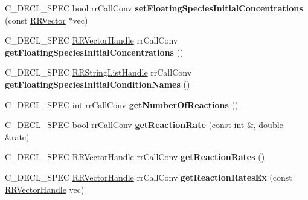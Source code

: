 \begin{DoxyCompactItemize}
\item 
\hypertarget{group__loadsave_ga338d8b7e0648b293a134e69bd7862dc6}{
\-C\-\_\-\-D\-E\-C\-L\-\_\-\-S\-P\-E\-C bool rr\-Call\-Conv {\bfseries set\-Floating\-Species\-Initial\-Concentrations} (const \hyperlink{struct_r_r_vector}{\-R\-R\-Vector} $\ast$vec)}
\label{group__loadsave_ga338d8b7e0648b293a134e69bd7862dc6}

\item 
\hypertarget{group__loadsave_ga6458f13569fc543075b559978f4f83ac}{
\-C\-\_\-\-D\-E\-C\-L\-\_\-\-S\-P\-E\-C \hyperlink{struct_r_r_vector}{\-R\-R\-Vector\-Handle} \*
rr\-Call\-Conv {\bfseries get\-Floating\-Species\-Initial\-Concentrations} ()}
\label{group__loadsave_ga6458f13569fc543075b559978f4f83ac}

\item 
\hypertarget{group__loadsave_ga4b87e338bfb9d788c31987f8154818f6}{
\-C\-\_\-\-D\-E\-C\-L\-\_\-\-S\-P\-E\-C \hyperlink{struct_r_r_string_list}{\-R\-R\-String\-List\-Handle} \*
rr\-Call\-Conv {\bfseries get\-Floating\-Species\-Initial\-Condition\-Names} ()}
\label{group__loadsave_ga4b87e338bfb9d788c31987f8154818f6}

\item 
\hypertarget{group__loadsave_gae25399f84ff2d1fda619358a1af9a1b5}{
\-C\-\_\-\-D\-E\-C\-L\-\_\-\-S\-P\-E\-C int rr\-Call\-Conv {\bfseries get\-Number\-Of\-Reactions} ()}
\label{group__loadsave_gae25399f84ff2d1fda619358a1af9a1b5}

\item 
\hypertarget{group__loadsave_ga0a7be404315c6001627ee26e738e11e2}{
\-C\-\_\-\-D\-E\-C\-L\-\_\-\-S\-P\-E\-C bool rr\-Call\-Conv {\bfseries get\-Reaction\-Rate} (const int \&, double \&rate)}
\label{group__loadsave_ga0a7be404315c6001627ee26e738e11e2}

\item 
\hypertarget{group__loadsave_ga86d544bcf3eeaa4698a60123a3da69aa}{
\-C\-\_\-\-D\-E\-C\-L\-\_\-\-S\-P\-E\-C \hyperlink{struct_r_r_vector}{\-R\-R\-Vector\-Handle} \*
rr\-Call\-Conv {\bfseries get\-Reaction\-Rates} ()}
\label{group__loadsave_ga86d544bcf3eeaa4698a60123a3da69aa}

\item 
\hypertarget{group__loadsave_gaa03d9414ddeb177a76365dd5b2d0042e}{
\-C\-\_\-\-D\-E\-C\-L\-\_\-\-S\-P\-E\-C \hyperlink{struct_r_r_vector}{\-R\-R\-Vector\-Handle} \*
rr\-Call\-Conv {\bfseries get\-Reaction\-Rates\-Ex} (const \hyperlink{struct_r_r_vector}{\-R\-R\-Vector\-Handle} vec)}
\label{group__loadsave_gaa03d9414ddeb177a76365dd5b2d0042e}


\end{DoxyCompactItemize}
